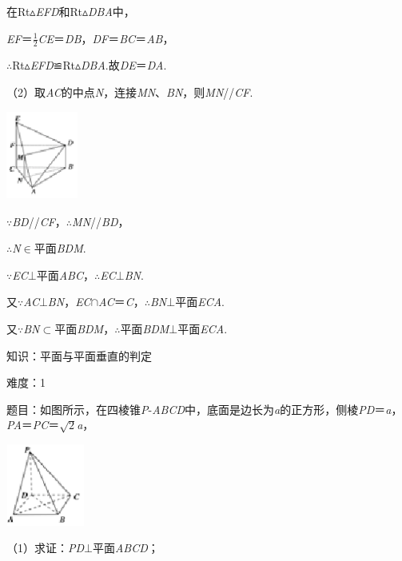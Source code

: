 \documentclass{article} %
\begin{document}
在Rt$\mathrm{\vartriangle}$\textit{EFD}和Rt$\mathrm{\vartriangle}$\textit{DBA}中，

\textit{EF}＝$\frac{1}{2}$\textit{CE}＝\textit{DB}，\textit{DF}＝\textit{BC}＝\textit{AB}，

$\mathrm{\therefore}$Rt$\mathrm{\vartriangle}$\textit{EFD}≌Rt$\mathrm{\vartriangle}$\textit{DBA}.故\textit{DE}＝\textit{DA}.

（2）取\textit{AC}的中点\textit{N}，连接\textit{MN}、\textit{BN}，则\textit{MN}//\textit{CF}.

\includegraphics*[width=0.93in, height=1.14in, keepaspectratio=false]{image216}

$\mathrm{\because}$\textit{BD}//\textit{CF}，$\mathrm{\therefore}$\textit{MN}//\textit{BD}，

$\mathrm{\therefore}$\textit{N}$\mathrm{\in}$平面\textit{BDM}.

$\mathrm{\because}$\textit{EC}$\mathrm{\bot}$平面\textit{ABC}，$\mathrm{\therefore}$\textit{EC}$\mathrm{\bot}$\textit{BN}.

又$\mathrm{\because}$\textit{AC}$\mathrm{\bot}$\textit{BN}，\textit{EC}$\mathrm{\cap}$\textit{AC}＝\textit{C}，$\mathrm{\therefore}$\textit{BN}$\mathrm{\bot}$平面\textit{ECA}.

又$\mathrm{\because}$\textit{BN}$\mathrm{\subset }$平面\textit{BDM}，$\mathrm{\therefore}$平面\textit{BDM}$\mathrm{\bot}$平面\textit{ECA}.

知识：平面与平面垂直的判定

难度：1

题目：如图所示，在四棱锥\textit{P}-\textit{ABCD}中，底面是边长为\textit{a}的正方形，侧棱\textit{PD}＝\textit{a}，\textit{PA}＝\textit{PC}＝$\sqrt{2}$\textit{a}，

\includegraphics*[width=1.02in, height=1.06in, keepaspectratio=false]{image217}

（1）求证：\textit{PD}$\mathrm{\bot}$平面\textit{ABCD}；
\end{document}
